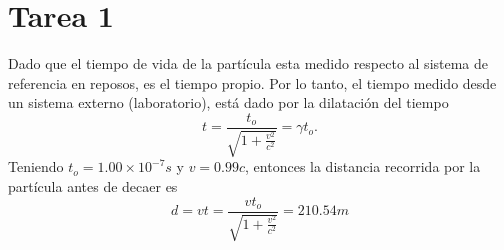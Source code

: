 \section{Tarea 1}
Dado que el tiempo de vida de la partícula esta medido respecto al sistema de referencia en reposos, es el tiempo propio. Por lo tanto, el tiempo medido desde un sistema externo (laboratorio), está dado por la dilatación del tiempo
	\begin{equation}
		t = \frac{t_o}{\sqrt{1 + \frac{v^2}{c^2}}} = \gamma t_o . \label{dilatacion_tiempo}
	\end{equation}
Teniendo $t_o = 1.00 \times 10^{-7} s$ y $v = 0.99c$, entonces la distancia recorrida por la partícula antes de decaer es
	\begin{equation}
		d = vt = \frac{v t_o}{\sqrt{1 + \frac{v^2}{c^2}}} = \boxed{ 210.54 m }
	\end{equation}